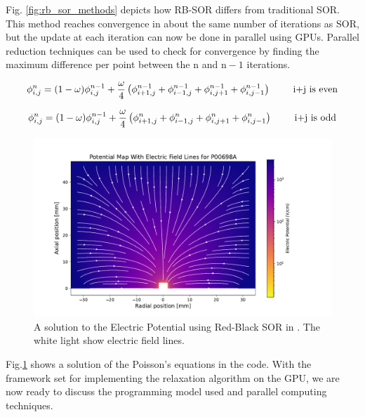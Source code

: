 Fig. \ref{fig:rb_sor_methods} depicts how RB-SOR differs from traditional SOR. This method reaches convergence in about the same number of iterations as SOR, but the update at each iteration can now be done in parallel using GPUs. Parallel reduction techniques can be used to check for convergence by finding the maximum difference per point between the $\text{n}$ and $\text{n}-1$ iterations. 

\begin{equation}{\label{rb_e}}
 \phi_{i,j}^{n} = (1-\omega)\phi^{n-1}_{i,j} + \frac{\omega}{4} \left(\phi^{n-1}_{i+1,j} + \phi^{n-1}_{i-1,j} + \phi^{n-1}_{i,j+1} + \phi^{n-1}_{i,j-1} \right) \qquad \text{ i+j is even}
\end{equation}

\begin{equation}{\label{rb_o}}
 \phi_{i,j}^{n} = (1-\omega)\phi^{n-1}_{i,j} + \frac{\omega}{4} \left(\phi^{n}_{i+1,j} + \phi^n_{i-1,j} + \phi^{n}_{i,j+1} + \phi^n_{i,j-1} \right) \qquad \text{ i+j is odd}
\end{equation}

\begin{figure}[!htb]
\centering
 \includegraphics[width=\linewidth]{ch4/figs/elect_pot_P00698A.pdf}
\caption{\label{fig:sor_pot_sol} A solution to the Electric Potential using Red-Black SOR in {\tdsim}. The white light show electric field lines.}
\label{ch4:fig:elect_pot_soln}
\end{figure}

Fig.\ref{ch4:fig:elect_pot_soln} shows a solution of the Poisson's equations in the code. With the framework set for implementing the relaxation algorithm on the GPU, we are now ready to discuss the programming model used and parallel computing techniques.


